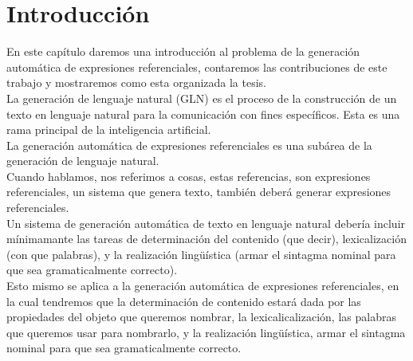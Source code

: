 \chapter{Introducci\'on}


En este cap\'itulo daremos una introducci\'on al problema de la generaci\'on autom\'atica de expresiones referenciales, contaremos las contribuciones de este trabajo y mostraremos como esta organizada la tesis.\\

La generaci\'on de lenguaje natural (GLN) es el proceso de la construcci\'on de un texto en lenguaje natural para la comunicaci\'on con fines espec\'ificos. Esta es una rama principal de la inteligencia artificial.\\

La generaci\'on autom\'atica de expresiones referenciales es una sub\'area de la generaci\'on de lenguaje natural.\\

Cuando hablamos, nos referimos a cosas, estas referencias, son expresiones referenciales, un sistema que genera texto, tambi\'en deber\'a generar expresiones referenciales.\\


Un sistema de generaci\'on autom\'atica de texto en lenguaje natural deber\'ia incluir m\'inimamante 
las tareas de determinaci\'on del contenido (que decir), lexicalizaci\'on (con que palabras), y la realizaci\'on ling\"{u}\'istica (armar el  sintagma nominal para que sea gramaticalmente correcto). \\


Esto mismo se aplica a la generaci\'on autom\'atica de expresiones referenciales, en la cual tendremos que la determinaci\'on de contenido estar\'a dada por las propiedades del objeto que queremos nombrar, la lexicalicalizaci\'on, las palabras que queremos usar para nombrarlo, y la realizaci\'on ling\"u\'istica, armar el sintagma nominal para que sea gramaticalmente correcto.\\

 



